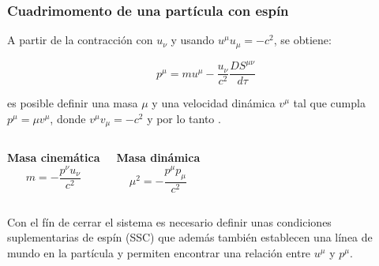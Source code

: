 \documentclass[aspectratio=169,10pt,usenames,dvipsnames,spanish]{beamer}
\begin{document}
\begin{frame}
\frametitle{Cuadrimomento de una partícula con espín}

A partir de la contracción con $u_\nu$ y usando $u^\mu u_\mu=-c^2$, se obtiene:

\begin{equation}\label{Momentoespin}
    p^\mu = m u^\mu - \frac{u_\nu}{c^2} \frac{D S^{\mu\nu}}{d\tau}
\end{equation}

\vspace{0.4cm}
es posible definir una masa $\mu$ y una velocidad dinámica $v^\mu$ tal que cumpla $p^\mu=\mu v^\mu$, donde $v^\mu v_\mu=-c^2$ y por lo tanto \cite{Gerakopoulos2014,Knickmann2015,Ehlers1979}.
\vspace{0.4cm}
\begin{columns}

\textbf{Masa cinemática}
\begin{equation*}
    m = -\frac{p^\nu u_\nu}{c^2}
\end{equation*}


\textbf{Masa dinámica}
\begin{equation*}
    \mu^2 = -\frac{p^\mu p_\mu}{c^2}
\end{equation*}
\end{columns}


Con el fín de cerrar el sistema es necesario definir unas condiciones suplementarias de espín (SSC) que además también establecen una línea de mundo en la partícula y permiten encontrar una relación entre $u^\mu$ y $p^\mu$.
\end{frame}



\end{document}
